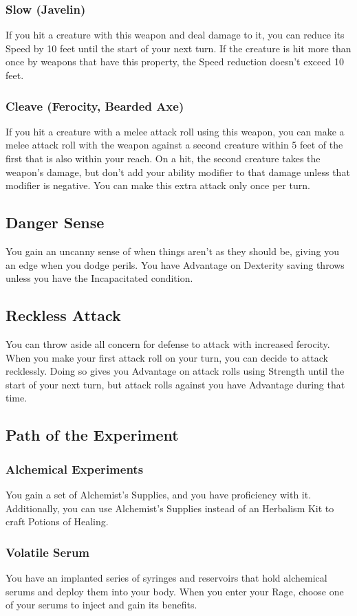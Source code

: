 \documentclass[letterpaper,openany,oneside,twocolumn]{book}
\begin{document}
\subsubsection*{Slow (Javelin)}
If you hit a creature with this weapon and deal damage to it, you can reduce its Speed by 10 feet until the start of your next turn. If the creature is hit more than once by weapons that have this property, the Speed reduction doesn't exceed 10 feet.
\subsubsection*{Cleave (Ferocity, Bearded Axe)}
If you hit a creature with a melee attack roll using this weapon, you can make a melee attack roll with the weapon against a second creature within 5 feet of the first that is also within your reach. On a hit, the second creature takes the weapon's damage, but don't add your ability modifier to that damage unless that modifier is negative. You can make this extra attack only once per turn.
\subsection*{Danger Sense}
You gain an uncanny sense of when things aren't as they should be, giving you an edge when you dodge perils. You have Advantage on Dexterity saving throws unless you have the Incapacitated condition.
\subsection*{Reckless Attack}
You can throw aside all concern for defense to attack with increased ferocity. When you make your first attack roll on your turn, you can decide to attack recklessly. Doing so gives you Advantage on attack rolls using Strength until the start of your next turn, but attack rolls against you have Advantage during that time.
\subsection*{Path of the Experiment}
\subsubsection*{Alchemical Experiments}
You gain a set of Alchemist's Supplies, and you have proficiency with it. Additionally, you can use Alchemist's Supplies instead of an Herbalism Kit to craft Potions of Healing.
\subsubsection*{Volatile Serum}
You have an implanted series of syringes and reservoirs that hold alchemical serums and deploy them into your body. When you enter your Rage, choose one of your serums to inject and gain its benefits.
\end{document}
